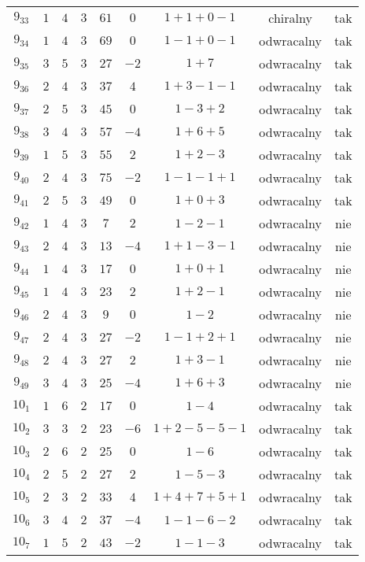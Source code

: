 \begin{longtable}{ccccccccc}
$9_{33}$ & $1$ & $4$ & $3$ & $61$ & $0$ & $1+1+0-1$ & chiralny & tak \\
$9_{34}$ & $1$ & $4$ & $3$ & $69$ & $0$ & $1-1+0-1$ & odwracalny & tak \\
$9_{35}$ & $3$ & $5$ & $3$ & $27$ & $-2$ & $1+7$ & odwracalny & tak \\
$9_{36}$ & $2$ & $4$ & $3$ & $37$ & $4$ & $1+3-1-1$ & odwracalny & tak \\
$9_{37}$ & $2$ & $5$ & $3$ & $45$ & $0$ & $1-3+2$ & odwracalny & tak \\
$9_{38}$ & $3$ & $4$ & $3$ & $57$ & $-4$ & $1+6+5$ & odwracalny & tak \\
$9_{39}$ & $1$ & $5$ & $3$ & $55$ & $2$ & $1+2-3$ & odwracalny & tak \\
$9_{40}$ & $2$ & $4$ & $3$ & $75$ & $-2$ & $1-1-1+1$ & odwracalny & tak \\
$9_{41}$ & $2$ & $5$ & $3$ & $49$ & $0$ & $1+0+3$ & odwracalny & tak \\
$9_{42}$ & $1$ & $4$ & $3$ & $7$ & $2$ & $1-2-1$ & odwracalny & nie \\
$9_{43}$ & $2$ & $4$ & $3$ & $13$ & $-4$ & $1+1-3-1$ & odwracalny & nie \\
$9_{44}$ & $1$ & $4$ & $3$ & $17$ & $0$ & $1+0+1$ & odwracalny & nie \\
$9_{45}$ & $1$ & $4$ & $3$ & $23$ & $2$ & $1+2-1$ & odwracalny & nie \\
$9_{46}$ & $2$ & $4$ & $3$ & $9$ & $0$ & $1-2$ & odwracalny & nie \\
$9_{47}$ & $2$ & $4$ & $3$ & $27$ & $-2$ & $1-1+2+1$ & odwracalny & nie \\
$9_{48}$ & $2$ & $4$ & $3$ & $27$ & $2$ & $1+3-1$ & odwracalny & nie \\
$9_{49}$ & $3$ & $4$ & $3$ & $25$ & $-4$ & $1+6+3$ & odwracalny & nie \\
$10_{1}$ & $1$ & $6$ & $2$ & $17$ & $0$ & $1-4$ & odwracalny & tak \\
$10_{2}$ & $3$ & $3$ & $2$ & $23$ & $-6$ & $1+2-5-5-1$ & odwracalny & tak \\
$10_{3}$ & $2$ & $6$ & $2$ & $25$ & $0$ & $1-6$ & odwracalny & tak \\
$10_{4}$ & $2$ & $5$ & $2$ & $27$ & $2$ & $1-5-3$ & odwracalny & tak \\
$10_{5}$ & $2$ & $3$ & $2$ & $33$ & $4$ & $1+4+7+5+1$ & odwracalny & tak \\
$10_{6}$ & $3$ & $4$ & $2$ & $37$ & $-4$ & $1-1-6-2$ & odwracalny & tak \\
$10_{7}$ & $1$ & $5$ & $2$ & $43$ & $-2$ & $1-1-3$ & odwracalny & tak \\

\end{longtable}
